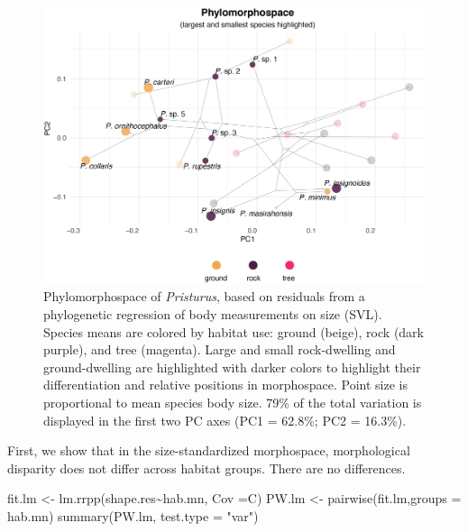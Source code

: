 \documentclass[
  11pt,
]{article}
\newenvironment{Shaded}{\begin{snugshade}}{\end{snugshade}}
\newcommand{\AttributeTok}[1]{\textcolor[rgb]{0.77,0.63,0.00}{#1}}
\newcommand{\FunctionTok}[1]{\textcolor[rgb]{0.00,0.00,0.00}{#1}}
\newcommand{\NormalTok}[1]{#1}
\newcommand{\OtherTok}[1]{\textcolor[rgb]{0.56,0.35,0.01}{#1}}
\newcommand{\SpecialCharTok}[1]{\textcolor[rgb]{0.00,0.00,0.00}{#1}}
\newcommand{\StringTok}[1]{\textcolor[rgb]{0.31,0.60,0.02}{#1}}
\begin{document}
\begin{figure}

{\centering \includegraphics[width=1\linewidth]{Figs/old_figures/figure_5_phylomorphospace_large_small} 

}

\caption{Phylomorphospace of \textit{Pristurus}, based on residuals from a phylogenetic regression of body measurements on size (SVL). Species means are colored by habitat use: ground (beige), rock (dark purple), and tree (magenta). Large and small rock-dwelling and ground-dwelling are highlighted with darker colors to highlight their differentiation and relative positions in morphospace. Point size is proportional to mean species body size. 79\% of the total variation is displayed in the first two PC axes (PC1 = 62.8\%; PC2 = 16.3\%).}\label{fig:unnamed-chunk-9}
\end{figure}

First, we show that in the size-standardized morphospace, morphological
disparity does not differ across habitat groups. There are no
differences.

\begin{Shaded}
\begin{Highlighting}[]
\NormalTok{fit.lm }\OtherTok{\textless{}{-}} \FunctionTok{lm.rrpp}\NormalTok{(shape.res}\SpecialCharTok{\textasciitilde{}}\NormalTok{hab.mn, }\AttributeTok{Cov =}\NormalTok{C)}
\NormalTok{PW.lm }\OtherTok{\textless{}{-}} \FunctionTok{pairwise}\NormalTok{(fit.lm,}\AttributeTok{groups =}\NormalTok{ hab.mn)}
\FunctionTok{summary}\NormalTok{(PW.lm, }\AttributeTok{test.type =} \StringTok{"var"}\NormalTok{)}
\end{Highlighting}
\end{Shaded}
\end{document}
